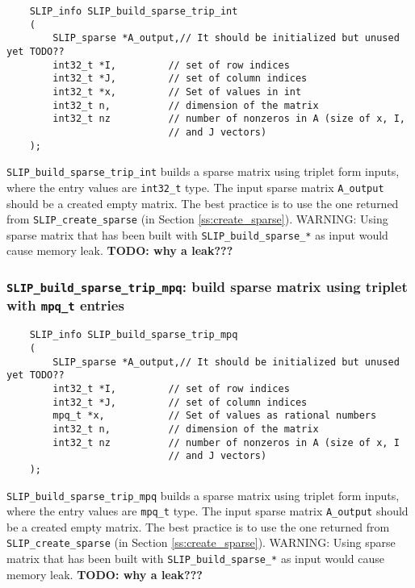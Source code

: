 \documentclass[12pt]{article}
\theoremstyle{definition}
\begin{document}
\begin{mdframed}[userdefinedwidth=6in]
{\footnotesize
\begin{verbatim}
    SLIP_info SLIP_build_sparse_trip_int
    (
        SLIP_sparse *A_output,// It should be initialized but unused yet TODO??
        int32_t *I,         // set of row indices
        int32_t *J,         // set of column indices
        int32_t *x,         // Set of values in int
        int32_t n,          // dimension of the matrix
        int32_t nz          // number of nonzeros in A (size of x, I,
                            // and J vectors)
    );
\end{verbatim}
} \end{mdframed}

\verb|SLIP_build_sparse_trip_int| builds a sparse matrix using triplet form
inputs, where the entry values are \verb|int32_t| type. The input sparse matrix
\verb|A_output| should be a created empty matrix. The best practice is to use
the one returned from \verb|SLIP_create_sparse| (in Section
\ref{ss:create_sparse}). WARNING: Using sparse matrix that has been built with
\verb|SLIP_build_sparse_*| as input would cause memory leak.
{\bf TODO: why a leak???} %

\cprotect\subsubsection{\verb|SLIP_build_sparse_trip_mpq|: build sparse matrix using triplet with \verb|mpq_t| entries}
\label{s:user:build_sparse_trip_mpq}

\begin{mdframed}[userdefinedwidth=6in]
{\footnotesize
\begin{verbatim}
    SLIP_info SLIP_build_sparse_trip_mpq
    (
        SLIP_sparse *A_output,// It should be initialized but unused yet TODO??
        int32_t *I,         // set of row indices
        int32_t *J,         // set of column indices
        mpq_t *x,           // Set of values as rational numbers
        int32_t n,          // dimension of the matrix
        int32_t nz          // number of nonzeros in A (size of x, I
                            // and J vectors)
    );
\end{verbatim}
} \end{mdframed}

\verb|SLIP_build_sparse_trip_mpq| builds a sparse matrix using triplet form
inputs, where the entry values are \verb|mpq_t| type. The input sparse matrix
\verb|A_output| should be a created empty matrix. The best practice is to use
the one returned from \verb|SLIP_create_sparse| (in Section
\ref{ss:create_sparse}). WARNING: Using sparse matrix that has been built with
\verb|SLIP_build_sparse_*| as input would cause memory leak.
{\bf TODO: why a leak???} %
\end{document}
